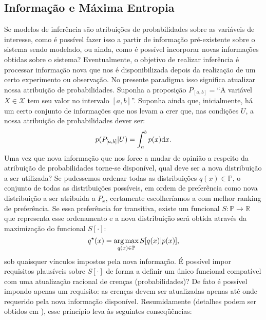 \subsection{Informação e Máxima Entropia}
Se modelos de inferência são atribuições de probabilidades sobre as variáveis de interesse, como é possível fazer isso a partir de informação pré-existente sobre o sistema sendo modelado, ou ainda, como é possível incorporar novas informações obtidas sobre o sistema? 
Eventualmente, o objetivo de realizar inferência é processar informação nova que nos é disponibilizada depois da realização de um certo experimento ou observação. No presente paradigma isso significa atualizar nossa atribuição de probabilidades. Suponha a proposição $P_{[a,b]} =$``A variável $X\in \mathcal{X}$ tem seu valor no intervalo $[a,b]$''. Suponha ainda que, inicialmente, há um certo conjunto de informações que nos levam a crer que, nas condições $U$, a nossa atribuição de probabilidades dever ser:
\[
 p(P_{[a,b]} | U ) = \int_a^b p(x) \mathrm{d} x.
\]
Uma vez que nova informação que nos force a mudar de opinião a respeito da atribuição de probabilidades torne-se disponível, qual deve ser a nova distribuição a ser utilizada? Se pudessemos ordenar todas as distribuições $q(x) \in \mathbb{P}$, o conjunto de todas as distribuições possíveis, em ordem de preferência como nova distribuição a ser atribuida a $P_x$, certamente escolheríamos a com melhor ranking de preferência. Se essa preferência for transitiva, existe um funcional $S:\mathbb{P}\to\mathbb{R}$ que representa esse ordenamento e a nova distribuição será obtida através da maximização do funcional $S[\cdot]$:
\[
 q^{\star}(x) = \operatorname*{arg\,max}_{q(x) \in \mathbb{P}} S[q(x) | p(x)], 
\]
sob quaisquer vínculos impostos pela nova informação. É possível impor requisitos plausíveis sobre $S[\cdot]$ de forma a definir um único funcional compatível com uma atualização racional de crenças (probabilidades)? De fato é possível impondo apenas um requisito: as crenças devem ser atualizadas apenas até onde requerido pela nova informação disponível. Resumidamente (detalhes podem ser obtidos em \citet{ACaticha2008}), esse princípio leva às seguintes conseqüências:
